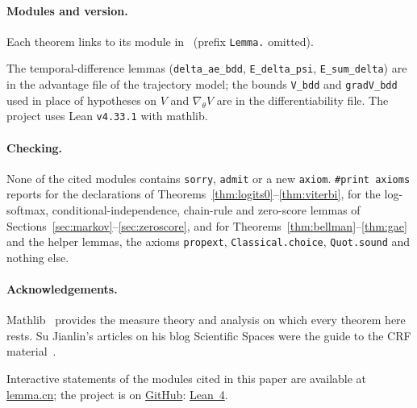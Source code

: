 \documentclass[11pt,a4paper]{article}
\newcommand{\grad}{\nabla_{\theta}}
\begin{document}
\paragraph{Modules and version.}
Each theorem links to its module in~\cite{lemma_repo} (prefix \texttt{Lemma.} omitted).

The temporal-difference lemmas (\texttt{delta\_ae\_bdd}, \texttt{E\_delta\_psi}, \texttt{E\_sum\_delta}) are in the advantage file of the trajectory model; the bounds \texttt{V\_bdd} and \texttt{gradV\_bdd} used in place of hypotheses on $V$ and $\grad V$ are in the differentiability file.
The project uses Lean \texttt{v4.33.1} with mathlib.

\paragraph{Checking.}
None of the cited modules contains \texttt{sorry}, \texttt{admit} or a new \texttt{axiom}.
\texttt{\#print axioms} reports for the declarations of Theorems~\ref{thm:logits0}--\ref{thm:viterbi}, for the log-softmax, conditional-independence, chain-rule and zero-score lemmas of Sections~\ref{sec:markov}--\ref{sec:zeroscore}, and for Theorems~\ref{thm:bellman}--\ref{thm:gae} and the helper lemmas, the axioms \texttt{propext}, \texttt{Classical.choice}, \texttt{Quot.sound} and nothing else.

\paragraph{Acknowledgements.}
Mathlib~\cite{mathlib2020,mathlib} provides the measure theory and analysis on which every theorem here rests.
Su Jianlin's articles on his blog Scientific Spaces were the guide to the CRF material~\cite{su2017crf,su2018search}.




\medskip
\noindent\small Interactive statements of the modules cited in this paper are available at \href{http://www.lemma.cn/}{lemma.cn}; the project is on \href{https://github.com/math-proof/lemma}{GitHub}: \href{http://www.lemma.cn/lean/?module=Tensor.EqDot_GradExpect.of.Eq_Conditioned.Eq_Expect.All_Differentiable_Prob.GtInftySup.generalized_advantage_estimate}{Lean~4}.
\end{document}
